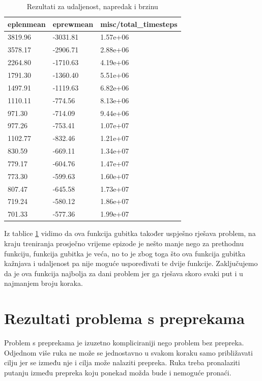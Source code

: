 \documentclass[times,utf8,diplomski]{fer}
\begin{document}
\begin{table}[ht!]
\centering
\caption{Rezultati za udaljenost, napredak i brzinu}
\label{tab:runb}
\begin{tabular}{@{}lll@{}}
\hline
eplenmean & eprewmean & misc/total\_timesteps \\
\hline
\hline
3819.96 & -3031.81 & 1.57e+06 \\ 
3578.17 & -2906.71 & 2.88e+06 \\ 
2264.80 & -1710.63 & 4.19e+06 \\ 
1791.30 & -1360.40 & 5.51e+06 \\ 
1497.91 & -1119.63 & 6.82e+06 \\ 
1110.11 & -774.56 & 8.13e+06 \\ 
971.30 & -714.09 & 9.44e+06 \\ 
977.26 & -753.41 & 1.07e+07 \\ 
1102.77 & -832.46 & 1.21e+07 \\ 
830.59 & -669.11 & 1.34e+07 \\ 
779.17 & -604.76 & 1.47e+07 \\ 
773.30 & -599.63 & 1.60e+07 \\ 
807.47 & -645.58 & 1.73e+07 \\ 
719.24 & -580.12 & 1.86e+07 \\ 
701.33 & -577.36 & 1.99e+07 \\ 
\hline
\end{tabular}
\end{table}

Iz tablice \ref{tab:runb} vidimo da ova funkcija gubitka također uspješno rješava problem, na kraju treniranja prosječno vrijeme epizode je nešto manje nego za prethodnu funkciju, funkcija gubitka je veća, no to je zbog toga što ova funkcija gubitka kažnjava i udaljenost pa nije moguće uspoređivati te dvije funkcije. Zaključujemo da je ova funkcija najbolja za dani problem jer ga rješava skoro svaki put i u najmanjem broju koraka.


\section{Rezultati problema s preprekama}

Problem s preprekama je izuzetno kompliciraniji nego problem bez prepreka. Odjednom više ruka ne može se jednostavno u svakom koraku samo približavati cilju jer se između nje i cilja može nalaziti prepreka. Ruka treba pronalaziti putanju između prepreka koju ponekad možda bude i nemoguće pronaći. 
\end{document}
